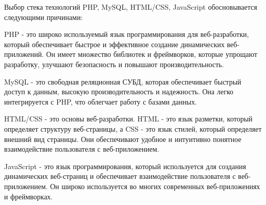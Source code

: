
Выбор стека технологий PHP, MySQL, HTML/CSS, JavaScript обосновывается следующими причинами\cite{rek}: 

PHP - это широко используемый язык программирования для веб-разработки, который обеспечивает быстрое и эффективное создание динамических веб-приложений. Он имеет множество библиотек и фреймворков, которые упрощают разработку, улучшают безопасность и повышают производительность.

MySQL - это свободная реляционная СУБД, которая обеспечивает быстрый доступ к данным, высокую производительность и надежность. Она легко интегрируется с PHP, что облегчает работу с базами данных.

HTML/CSS - это основы веб-разработки. HTML - это язык разметки, который определяет структуру веб-страницы, а CSS - это язык стилей, который определяет внешний вид страницы. Они обеспечивают удобное и интуитивно понятное взаимодействие пользователя с веб-приложением.

JavaScript - это язык программирования, который используется для создания динамических веб-страниц и обеспечивает взаимодействие пользователя с веб-приложением. Он широко используется во многих современных веб-приложениях и фреймворках.
